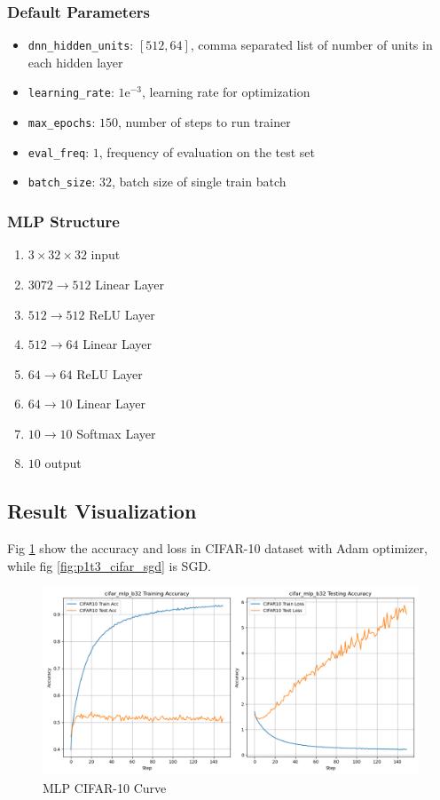 \documentclass{article}
\begin{document}
\subsubsection{Default Parameters}

\begin{itemize}
    \item \texttt{dnn\_hidden\_units}: $[512, 64]$, comma separated list of number of units in each hidden layer
    \item \texttt{learning\_rate}: $1\mathrm{e}^{-3}$, learning rate for optimization
    \item \texttt{max\_epochs}: $150$, number of steps to run trainer
    \item \texttt{eval\_freq}: $1$, frequency of evaluation on the test set
    \item \texttt{batch\_size}: $32$, batch size of single train batch
\end{itemize}

\subsubsection{MLP Structure}

\begin{enumerate}
    \item $3 \times 32 \times 32$ input
    \item $3072 \to 512 $ Linear Layer    
    \item $512 \to 512 $ ReLU Layer
    \item $512 \to 64 $ Linear Layer
    \item $64 \to 64 $ ReLU Layer
    \item $64 \to 10 $ Linear Layer
    \item $10 \to 10$ Softmax Layer
    \item $10$ output
\end{enumerate}

\subsection{Result Visualization}

Fig \ref{fig:p1t3_cifar_adam} show the accuracy and loss in CIFAR-10 dataset with Adam optimizer, while fig \ref{fig:p1t3_cifar_sgd} is SGD.

\begin{figure}[!htbp]
    \centering
    \includegraphics[width=1\textwidth]{img/Part1/cifar_mlp_b32_adam.png}
    \caption{MLP CIFAR-10 Curve}
    \label{fig:p1t3_cifar_adam}
\end{figure}
\end{document}

